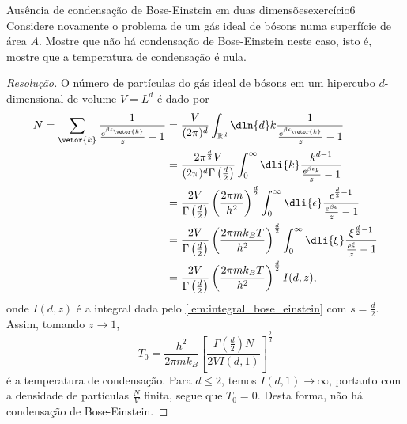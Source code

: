 \begin{exercício}{Ausência de condensação de Bose-Einstein em duas dimensões}{exercício6}
    Considere novamente o problema de um gás ideal de bósons numa superfície de área \(A\). Mostre que não há condensação de Bose-Einstein neste caso, isto é, mostre que a temperatura de condensação é nula.
\end{exercício}
\begin{proof}[Resolução]
    O número de partículas do gás ideal de bósons em um hipercubo \(d\)-dimensional de volume \(V=L^d\) é dado por
    \begin{align*}
        N = \sum_{\vetor{k}} \frac{1}{\frac{e^{\beta \epsilon_{\vetor{k}}}}{z}-1}
        &= \frac{V}{(2\pi)^d}\int_{\mathbb{R}^d} \dln{d}k \frac{1}{\frac{e^{\beta \epsilon_{\vetor{k}}}}{z}-1}\\
        &= \frac{2\pi^{\frac{d}{2}} V}{(2\pi)^d \Gamma\left(\frac{d}{2}\right)} \int_0^\infty \dli{k} \frac{k^{d-1}}{\frac{e^{\beta \epsilon_{k}}}{z}-1}\\
        &= \frac{2V}{\Gamma\left(\frac{d}{2}\right)}\left(\frac{2\pi m}{h^2}\right)^{\frac{d}{2}}\int_0^\infty\dli{\epsilon} \frac{\epsilon^{\frac{d}{2} -1 }}{\frac{e^{\beta \epsilon}}{z} - 1}\\
        &= \frac{2V}{\Gamma\left(\frac{d}{2}\right)}\left(\frac{2\pi m k_B T}{h^2}\right)^{\frac{d}{2}}\int_0^\infty\dli{\xi} \frac{\xi^{\frac{d}{2} -1 }}{\frac{e^{\xi}}{z} - 1}\\
        &= \frac{2V}{\Gamma\left(\frac{d}{2}\right)}\left(\frac{2\pi m k_B T}{h^2}\right)^{\frac{d}{2}}I(d, z),
    \end{align*}
    onde \(I(d,z)\) é a integral dada pelo \cref{lem:integral_bose_einstein} com \(s = \frac{d}{2}\). Assim, tomando \(z \to 1\),
    \begin{equation*}
        T_0 = \frac{h^2}{2\pi m k_B}\left[\frac{\Gamma\left(\frac{d}{2}\right)N}{2V I(d, 1)}\right]^{\frac2d}
    \end{equation*}
    é a temperatura de condensação. Para \(d \leq 2\), temos \(I(d,1) \to \infty\), portanto com a densidade de partículas \(\frac{N}{V}\) finita, segue que \(T_0 = 0\). Desta forma, não há condensação de Bose-Einstein.
\end{proof}
